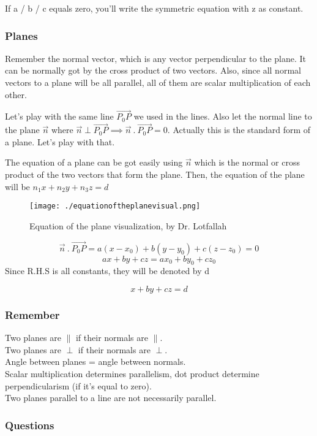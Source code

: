\documentclass{article}
\begin{document}
	If a / b / c equals zero, you'll write the symmetric equation with z as constant.

	\newpage
	\subsubsection{Planes}
	Remember the normal vector, which is any vector perpendicular to the plane. 
	It can be normally got by the cross product of two vectors.
	Also, since all normal vectors to a plane will be all parallel, all of them are scalar multiplication of each other. 

	Let's play with the same line $ \vec{ P_0P} $ we used in the lines. Also let the normal line to the plane $ \vec{ n } $ where $ \vec{ n } \perp \vec{ P_0P } \implies \vec{ n }\ .\ \vec{ P_0P } = 0$. Actually this is the standard form of a plane. Let's play with that.

	The equation of a plane can be got easily using  $\vec{n}$ which is the normal or cross product of the two vectors that form the plane. Then, the equation of the plane will be $ n_1 x + n_2 y + n_3 z = d$
	\begin{figure}[h]
		\centering
		\texttt{[image: ./equationoftheplanevisual.png]}
		\caption{Equation of the plane visualization, by Dr. Lotfallah}
		\label{fig:lotfalla_plane_1}
	\end{figure}
	\[
		\vec{ n }\ .\ \vec{ P_0P } = a(x-x_0) + b(y-y_0) + c(z-z_0) = 0 
	\]
	\[
		ax+by+cz = ax_0+by_0+cz_0	
	\]
	Since R.H.S is all constants, they will be denoted by d

	\[
		x+by+cz = d
	\]



	\subsubsection{Remember}

	Two planes are $ \parallel $ if their normals are $\parallel$. 
	\\
	Two planes are $ \perp $ if their normals are $\perp$. \\
	Angle between planes = angle between normals.
	\\
	Scalar multiplication determines parallelism, dot product determine perpendicularism (if it's equal to zero).
	\\
	Two planes parallel to a line are not necessarily parallel.

	\newpage
	\subsubsection{Questions}
\end{document}
